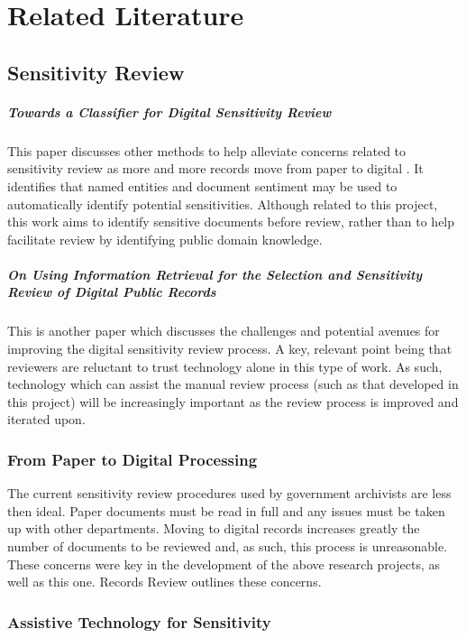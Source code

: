 \documentclass{l4proj}
\begin{document}
\chapter{Related Literature}
\section{Sensitivity Review}
\paragraph{Towards a Classifier for Digital Sensitivity Review}
This paper discusses other methods to help alleviate concerns related to sensitivity review as more and more records move from paper to digital \cite{mcdonald2014towards}. It identifies that named entities and document sentiment may be used to automatically identify potential sensitivities. Although related to this project, this work aims to identify sensitive documents before review, rather than to help facilitate review by identifying public domain knowledge.

\paragraph{On Using Information Retrieval for the Selection and Sensitivity Review of Digital Public Records}
This is another paper which discusses the challenges and potential avenues for improving the digital sensitivity review process\cite{gollins2014using}. A key, relevant point being that reviewers are reluctant to trust technology alone in this type of work. As such, technology which can assist the manual review process (such as that developed in this project) will be increasingly important as the review process is improved and iterated upon.

\subsection{From Paper to Digital Processing}
The current sensitivity review procedures used by government archivists are less then ideal. Paper documents must be read in full and any issues must be taken up with other departments. Moving to digital records increases greatly the number of documents to be reviewed and, as such, this process is unreasonable. These concerns were key in the development of the above research projects, as well as this one. Records Review \cite{allan2014record} outlines these concerns.

\subsection{Assistive Technology for Sensitivity}
\end{document}

